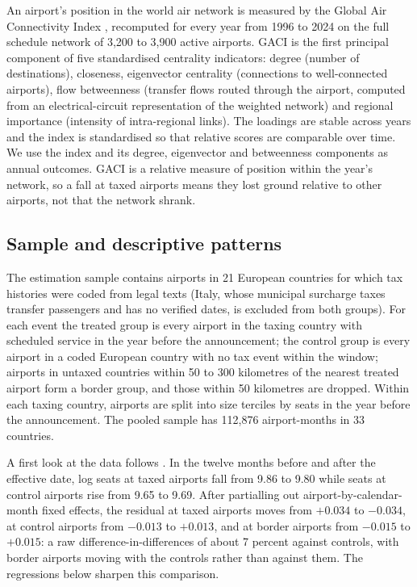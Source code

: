 An airport's position in the world air network is measured by the Global Air Connectivity Index
\citep{cheung2020}, recomputed for every year from 1996 to 2024 on the full schedule network of
3,200 to 3,900 active airports. GACI is the first principal component of five standardised centrality
indicators: degree (number of destinations), closeness, eigenvector centrality (connections to
well-connected airports), flow betweenness (transfer flows routed through the airport, computed from an
electrical-circuit representation of the weighted network) and regional importance (intensity of
intra-regional links). The loadings are stable across years and the index is standardised so that
relative scores are comparable over time. We use the index and its degree, eigenvector and betweenness
components as annual outcomes. GACI is a relative measure of position within the year's network, so a
fall at taxed airports means they lost ground relative to other airports, not that the network shrank.

\subsection{Sample and descriptive patterns}

The estimation sample contains airports in 21 European countries for which tax histories were coded
from legal texts (Italy, whose municipal surcharge taxes transfer passengers and has no verified
dates, is excluded from both groups). For each event the treated group is every airport in the taxing
country with scheduled service in the year before the announcement; the control group is every airport
in a coded European country with no tax event within the window; airports in untaxed countries within
50 to 300 kilometres of the nearest treated airport form a border group, and those within 50
kilometres are dropped. Within each taxing country, airports are split into size terciles by seats in
the year before the announcement. The pooled sample has 112,876 airport-months in 33 countries.

A first look at the data follows \citet{li2019subway}. In the twelve months before and after the
effective date, log seats at taxed airports fall from 9.86 to 9.80 while seats at control airports rise
from 9.65 to 9.69. After partialling out airport-by-calendar-month fixed effects, the residual at taxed
airports moves from $+0.034$ to $-0.034$, at control airports from $-0.013$ to $+0.013$, and at border
airports from $-0.015$ to $+0.015$: a raw difference-in-differences of about 7 percent against
controls, with border airports moving with the controls rather than against them. The regressions below
sharpen this comparison.


